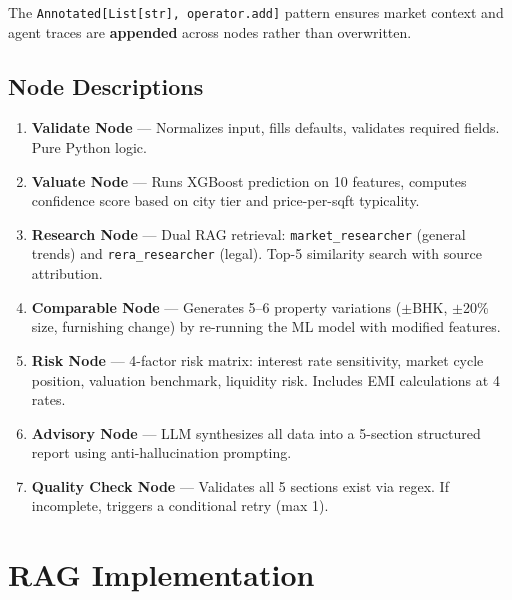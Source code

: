 \documentclass[12pt,a4paper]{article}
\begin{document}
The \texttt{Annotated[List[str], operator.add]} pattern ensures market context and agent traces are \textbf{appended} across nodes rather than overwritten.

\subsection{Node Descriptions}
\begin{enumerate}
    \item \textbf{Validate Node} — Normalizes input, fills defaults, validates required fields. Pure Python logic.
    \item \textbf{Valuate Node} — Runs XGBoost prediction on 10 features, computes confidence score based on city tier and price-per-sqft typicality.
    \item \textbf{Research Node} — Dual RAG retrieval: \texttt{market\_researcher} (general trends) and \texttt{rera\_researcher} (legal). Top-5 similarity search with source attribution.
    \item \textbf{Comparable Node} — Generates 5--6 property variations ($\pm$BHK, $\pm$20\% size, furnishing change) by re-running the ML model with modified features.
    \item \textbf{Risk Node} — 4-factor risk matrix: interest rate sensitivity, market cycle position, valuation benchmark, liquidity risk. Includes EMI calculations at 4 rates.
    \item \textbf{Advisory Node} — LLM synthesizes all data into a 5-section structured report using anti-hallucination prompting.
    \item \textbf{Quality Check Node} — Validates all 5 sections exist via regex. If incomplete, triggers a conditional retry (max 1).
\end{enumerate}

\section{RAG Implementation}
\end{document}
